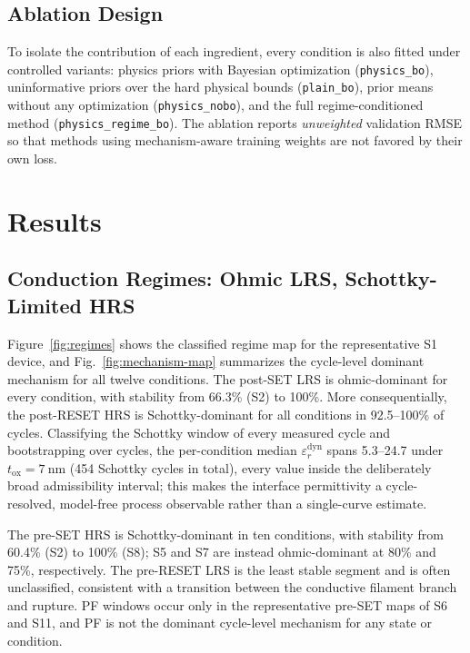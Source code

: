 \documentclass[journal]{IEEEtran}
\begin{document}
\subsection{Ablation Design}
\label{sec:ablation-design}

To isolate the contribution of each ingredient, every condition is also
fitted under controlled variants: physics priors with Bayesian optimization
(\texttt{physics\_bo}), uninformative priors over the hard physical bounds
(\texttt{plain\_bo}), prior means without any optimization
(\texttt{physics\_nobo}), and the full regime-conditioned method
(\texttt{physics\_regime\_bo}).  The ablation reports \emph{unweighted}
validation RMSE so that methods using mechanism-aware training weights are
not favored by their own loss.

\section{Results}
\label{sec:results}

\subsection{Conduction Regimes: Ohmic LRS, Schottky-Limited HRS}
\label{sec:res-regimes}

Figure~\ref{fig:regimes} shows the classified regime map for the
representative S1 device, and Fig.~\ref{fig:mechanism-map} summarizes the
cycle-level dominant mechanism for all twelve conditions.  The post-SET LRS
is ohmic-dominant for every condition, with stability from 66.3\% (S2) to
100\%.  More consequentially, the post-RESET HRS is Schottky-dominant for
all conditions in 92.5--100\% of cycles.  Classifying the Schottky window of
every measured cycle and bootstrapping over cycles, the per-condition median
$\varepsilon_r^{\mathrm{dyn}}$ spans 5.3--24.7 under
$t_{\mathrm{ox}}=\SI{7}{\nano\meter}$ (454 Schottky cycles in total), every
value inside the deliberately broad admissibility interval; this makes the
interface permittivity a cycle-resolved, model-free process observable rather
than a single-curve estimate.

The pre-SET HRS is Schottky-dominant in ten conditions, with stability from
60.4\% (S2) to 100\% (S8); S5 and S7 are instead ohmic-dominant at 80\% and
75\%, respectively.  The pre-RESET LRS is the least stable segment and is
often unclassified, consistent with a transition between the conductive
filament branch and rupture.  PF windows occur only in the representative
pre-SET maps of S6 and S11, and PF is not the dominant cycle-level mechanism
for any state or condition.
\end{document}
